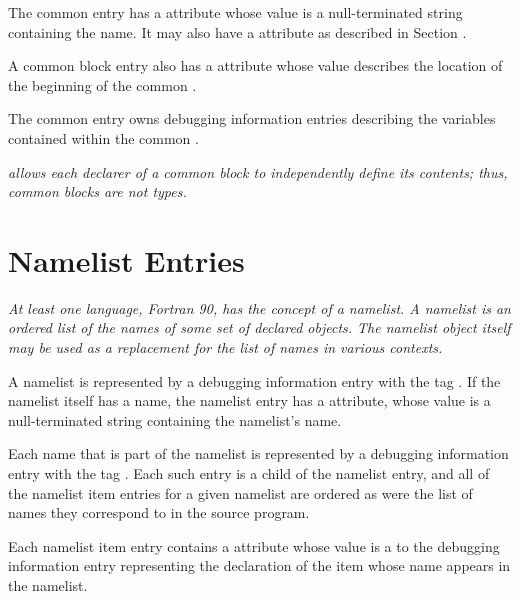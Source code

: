 The common  
entry has a \DWATname{} attribute 
whose value is a null-terminated
string containing the
name.
\bbeb
It may also have a \DWATlinkagename{} attribute as described 
in Section . 

A common block entry also has a \DWATlocation{} attribute
whose value describes the
location of the beginning of the common . 

The common
 entry owns debugging information entries describing
the variables contained within the common .

\textit{ allows each declarer of a common block 
to independently define its contents; thus, common blocks are not types.}

\section{Namelist Entries}
\label{chap:namelistentries}
\textit{At least one language, Fortran 90, has the concept of a
namelist. A namelist is an ordered list of the names of some
set of declared objects. The namelist object itself may be used
as a replacement for the list of names in various contexts.}

A namelist is represented by a debugging information entry
with the 
tag \DWTAGnamelistTARG. 
If the namelist itself has a
name, the namelist entry has a \DWATname{} attribute,
whose value is a null-terminated
string containing the namelist\textquoteright{}s
name.
\bbeb

Each\hypertarget{chap:DWATnamelistitemnamelistitem}{}
name that is part of the namelist is represented
by a debugging information entry with the tag
\DWTAGnamelistitemTARG. 
Each such entry is a child of the
namelist entry, and all of the 
namelist item entries for a
given namelist are ordered as were the list of names they
correspond to in the source program.

Each namelist item entry contains a 
\DWATnamelistitemDEFN{} attribute
whose 
value is a  to the debugging
information entry representing the declaration of the item
whose name appears in the namelist.


